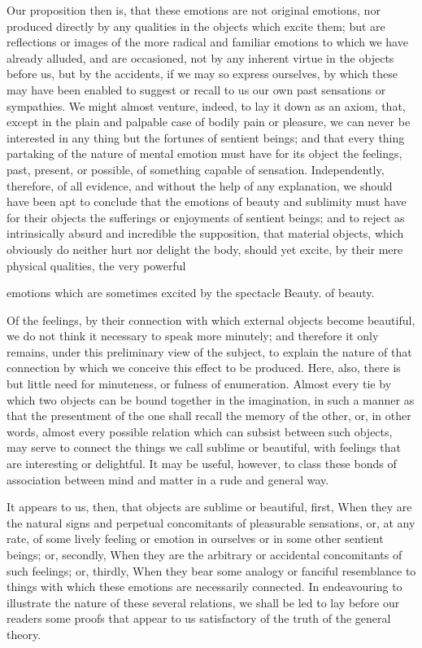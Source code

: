 \documentclass{article}
\begin{document}
Our proposition then is, that these emotions are not original emotions, nor produced directly by any qualities in the objects which excite them; but are reflections or images of the more radical and familiar emotions to which we have already alluded, and are occasioned, not by any inherent virtue in the objects before us, but by the accidents, if we may so express ourselves, by which these may have been enabled to suggest or recall to us our own past sensations or sympathies. We might almost venture, indeed, to lay it down as an axiom, that, except in the plain and palpable case of bodily pain or pleasure, we can never be interested in any thing but the fortunes of sentient beings; and that every thing partaking of the nature of mental emotion must have for its object the feelings, past, present, or possible, of something capable of sensation. Independently, therefore, of all evidence, and without the help of any explanation, we should have been apt to conclude that the emotions of beauty and sublimity must have for their objects the sufferings or enjoyments of sentient beings; and to reject as intrinsically absurd and incredible the supposition, that material objects, which obviously do neither hurt nor delight the body, should yet excite, by their mere physical qualities, the very powerful

emotions which are sometimes excited by the spectacle Beauty.
of beauty.

Of the feelings, by their connection with which external objects become beautiful, we do not think it necessary to speak more minutely; and therefore it only remains, under this preliminary view of the subject, to explain the nature of that connection by which we conceive this effect to be produced. Here, also, there is but little need for minuteness, or fulness of enumeration. Almost every tie by which two objects can be bound together in the imagination, in such a manner as that the presentment of the one shall recall the memory of the other, or, in other words, almost every possible relation which can subsist between such objects, may serve to connect the things we call sublime or beautiful, with feelings that are interesting or delightful. It may be useful, however, to class these bonds of association between mind and matter in a rude and general way.

It appears to us, then, that objects are sublime or beautiful, first, When they are the natural signs and perpetual concomitants of pleasurable sensations, or, at any rate, of some lively feeling or emotion in ourselves or in some other sentient beings; or, secondly, When they are the arbitrary or accidental concomitants of such feelings; or, thirdly, When they bear some analogy or fanciful resemblance to things with which these emotions are necessarily connected. In endeavouring to illustrate the nature of these several relations, we shall be led to lay before our readers some proofs that appear to us satisfactory of the truth of the general theory.
\end{document}
